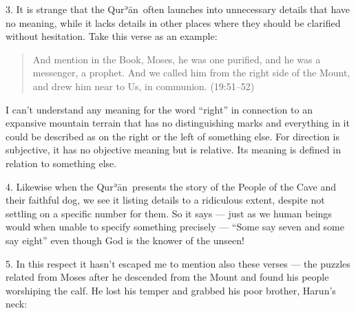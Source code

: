 \documentclass[12pt]{memoir}
\def\´{ʾ} %
\def \Quran{Qur\-\´ān} %
\newcommand{\QRef}[1]{{\color{darkblue}#1}}
\begin{document}
3. It is strange that the \Quran\ often launches
into unnecessary details that have no meaning,
while it lacks details in other places
where they should be clarified without hesitation.
Take this verse as an example:

\begin{quote}
And mention in the Book, Moses, he was one purified,
and he was a messenger, a prophet.
And we called him from the right side of the Mount,
and drew him near to Us, in communion.
(\QRef{19:51–52})
\end{quote}

I can’t understand any meaning for the word “right” in connection
to an expansive mountain terrain that has no distinguishing marks
and everything in it could be described as on the right or the left
of something else.
For direction is subjective,
it has no objective meaning but is relative.
Its meaning is defined in relation to something else.

4. Likewise when the \Quran\ presents the story
of the People of the Cave and their faithful dog,
we see it listing details to a ridiculous extent,
despite not settling on a specific number for them.
So it says — just as we human beings would when unable
to specify something precisely —
“Some say seven and some say eight”
even though God is the knower of the unseen!

5. In this respect it hasn’t escaped me to mention also these verses —
the puzzles related from Moses after he descended
from the Mount and found his people worshiping the calf.
He lost his temper and grabbed his poor brother, Harun’s neck:
\end{document}
